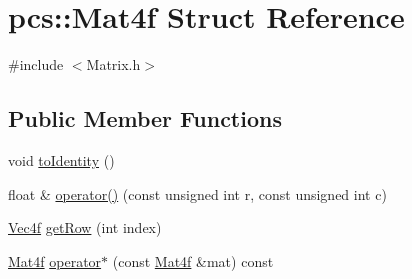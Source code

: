 \hypertarget{structpcs_1_1Mat4f}{}\section{pcs\+:\+:Mat4f Struct Reference}
\label{structpcs_1_1Mat4f}


{\ttfamily \#include $<$Matrix.\+h$>$}

\subsection*{Public Member Functions}
\begin{DoxyCompactItemize}
\item 
void \hyperlink{structpcs_1_1Mat4f_af43fedb87b0bf46325895dd098ae4600}{to\+Identity} ()
\item 
float \& \hyperlink{structpcs_1_1Mat4f_ac854e422b3f3bec5ffbbf366b71e5b0c}{operator()} (const unsigned int r, const unsigned int c)
\item 
\hyperlink{namespacepcs_a826b4146f438aa3a4c6a5c157bc8dea2}{Vec4f} \hyperlink{structpcs_1_1Mat4f_a0703785e2c39f97f89c8305578f40ed8}{get\+Row} (int index)
\item 
\hyperlink{structpcs_1_1Mat4f}{Mat4f} \hyperlink{structpcs_1_1Mat4f_abf5cbb6f96fe61bbd09820868fe23cae}{operator$\ast$} (const \hyperlink{structpcs_1_1Mat4f}{Mat4f} \&mat) const
\end{DoxyCompactItemize}
